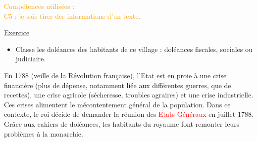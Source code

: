 \documentclass{beamer}
\begin{document}
\begin{frame}
\begin{flushright}
{\tiny \textcolor{orange}{Compétences utilisées : \\
C5 : je sais tirer des informations d'un texte.}}
\end{flushright}
\underline{Exercice}
\begin{itemize}
\item Classe les doléances des habitants de ce village : doléances fiscales, sociales ou judiciaire.
\end{itemize}
\end{frame}

\begin{frame}
\setlength{\parindent}{1cm} En 1788 (veille de la Révolution française), l'Etat est en proie à une crise financière (plus de dépense, notamment liée aux différentes guerres, que de recettes), une crise agricole (sécheresse, troubles agraires) et une crise industrielle. Ces crises alimentent le mécontentement général de la population.
\setlength{\parindent}{1cm} Dans ce contexte, le roi décide de demander la réunion des \textcolor{red}{Etats-Généraux} en juillet 1788. Grâce aux cahiers de doléances, les habitants du royaume font remonter leurs problèmes à la monarchie.
\end{frame}
  
\end{document}
